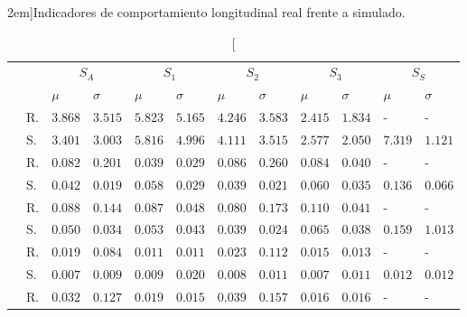 \begin{table*}
	\centering
	\caption[Indicadores de comportamiento longitudinal real frente a simulado][2em]{Indicadores de comportamiento longitudinal real frente a simulado.}
	\label{tbl:longitudinal-comparison}
	\begin{tabularx}{\linewidth}{cYYYYYYYYYYY}
		\toprule
		& &  &  &  &  & \\
		                  & $\mu$     & $\sigma$ & $\mu$    & $\sigma$ & $\mu$     & $\sigma$  & $\mu$    & $\sigma$   & $\mu$    & $\sigma$ \\
		\midrule
		     & R. & $3.868$ & $3.515$ & $5.823$ & $5.165$ & $4.246$ & $3.583$ & $2.415$ & $1.834$ &  -      &  - \\
                                                                              & S. & $3.401$ & $3.003$ & $5.816$ & $4.996$ & $4.111$ & $3.515$ & $2.577$ & $2.050$ & $7.319$ & $1.121$ \\
		    & R. & $0.082$ & $0.201$ & $0.039$ & $0.029$ & $0.086$ & $0.260$ & $0.084$ & $0.040$ &  -      &  - \\
                                                                              & S. & $0.042$ & $0.019$ & $0.058$ & $0.029$ & $0.039$ & $0.021$ & $0.060$ & $0.035$ & $0.136$ & $0.066$ \\
		    & R. & $0.088$ & $0.144$ & $0.087$ & $0.048$ & $0.080$ & $0.173$ & $0.110$ & $0.041$ &  -      &  - \\
                                                                              & S. & $0.050$ & $0.034$ & $0.053$ & $0.043$ & $0.039$ & $0.024$ & $0.065$ & $0.038$ & $0.159$ & $1.013$ \\
		   & R. & $0.019$ & $0.084$ & $0.011$ & $0.011$ & $0.023$ & $0.112$ & $0.015$ & $0.013$ &  -      &  - \\
                                                                              & S. & $0.007$ & $0.009$ & $0.009$ & $0.020$ & $0.008$ & $0.011$ & $0.007$ & $0.011$ & $0.012$ & $0.012$ \\
		   & R. & $0.032$ & $0.127$ & $0.019$ & $0.015$ & $0.039$ & $0.157$ & $0.016$ & $0.016$ &  -      &  - \\

\end{tabularx}
\end{table*}

